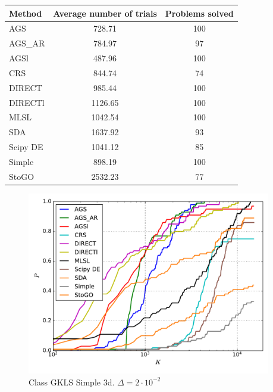 \documentclass[a4paper]{article}
\begin{document}
\begin{tabular}{lcc}
\hline
 Method   &  Average number of trials  &  Problems solved  \\
\hline
 AGS      &           728.71           &        100        \\
 AGS\_AR   &           784.97           &        97         \\
 AGSl     &           487.96           &        100        \\
 CRS      &           844.74           &        74         \\
 DIRECT   &           985.44           &        100        \\
 DIRECTl  &          1126.65           &        100        \\
 MLSL     &          1042.54           &        100        \\
 SDA      &          1637.92           &        93         \\
 Scipy DE &          1041.12           &        85         \\
 Simple   &           898.19           &        100        \\
 StoGO    &          2532.23           &        77         \\
\hline
\end{tabular}
\begin{figure}[H]
  \center
  \includegraphics[width=0.95\textwidth]{../experiments/gklss3d/cmc.pdf}
  \caption{Class GKLS Simple 3d. $\Delta=2\cdot10^{-2}$}
\end{figure}
\end{document}
